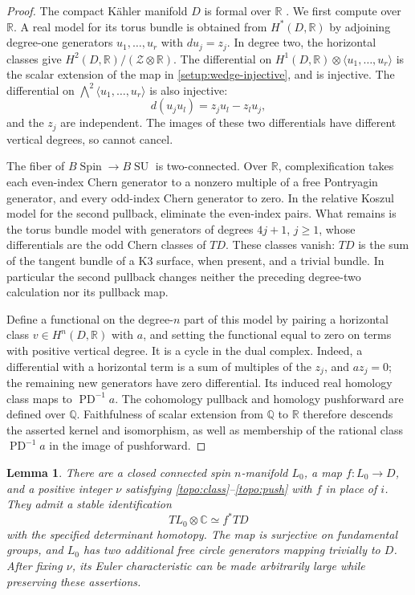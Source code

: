 \documentclass[11pt]{article}
\numberwithin{equation}{section}
\newtheorem{lemma}[theorem]{Lemma}
\theoremstyle{definition}
\theoremstyle{remark}
\newcommand{\Q}{\mathbb Q}
\newcommand{\R}{\mathbb R}
\newcommand{\C}{\mathbb C}
\DeclareMathOperator{\PD}{PD}
\DeclareMathOperator{\Spin}{Spin}
\DeclareMathOperator{\SU}{SU}
\begin{document}
\begin{proof}
The compact K\"ahler manifold $D$ is formal over $\R$
\cite{DeligneGriffithsMorganSullivan}.  We first compute over $\R$.
A real model for its torus bundle is obtained from $H^*(D,\R)$
by adjoining degree-one
generators $u_1,\ldots,u_r$ with $du_j=z_j$.  In degree two, the
horizontal classes give $H^2(D,\R)/(\mathcal Z\otimes\R)$.
The differential on
$H^1(D,\R)\otimes\langle u_1,\ldots,u_r\rangle$ is the scalar
extension of the map in \eqref{setup:wedge-injective}, and is
injective.  The differential
on $\bigwedge^2\langle u_1,\ldots,u_r\rangle$ is also injective:
\[
 d(u_j u_l)=z_j u_l-z_l u_j,
\]
and the $z_j$ are independent.  The images of these two differentials
have different vertical degrees, so cannot cancel.

The fiber of $B\Spin\to B\SU$ is two-connected.  Over $\R$,
complexification takes each even-index Chern generator to a nonzero
multiple of a free Pontryagin generator, and every odd-index Chern
generator to zero.  In the relative Koszul model for the second
pullback, eliminate the even-index pairs.  What remains is the torus
bundle model with generators of degrees $4j+1$, $j\geq1$, whose
differentials are the odd Chern classes of $TD$.  These classes vanish:
$TD$ is the sum of the tangent bundle of a K3 surface, when present,
and a trivial bundle.  In particular the second pullback changes
neither the preceding degree-two calculation nor its pullback map.

Define a functional on the degree-$n$ part of this model by pairing
a horizontal class $v\in H^n(D,\R)$ with $a$, and setting the
functional equal to zero on terms with positive vertical degree.
It is a cycle in the dual complex.  Indeed, a differential with a
horizontal term is a sum of multiples of the $z_j$, and
$a z_j=0$; the remaining new generators have zero differential.
Its induced real homology class maps to $\PD^{-1}a$.
The cohomology pullback and homology pushforward are defined over
$\Q$.  Faithfulness of scalar extension from $\Q$ to $\R$ therefore
descends the asserted kernel and isomorphism, as well as membership
of the rational class $\PD^{-1}a$ in the image of pushforward.
\end{proof}

\begin{lemma}\label{topo:source}
There are a closed connected spin $n$-manifold $L_0$, a map
$f:L_0\to D$, and a positive integer $\nu$ satisfying
\eqref{topo:class}--\eqref{topo:push} with $f$ in place of $i$.
They admit a stable identification
\begin{equation}\label{topo:stable}
 TL_0\otimes\C\simeq f^*TD
\end{equation}
with the specified determinant homotopy.  The map is surjective on
fundamental groups, and $L_0$ has two additional free circle generators
mapping trivially to $D$.  After fixing $\nu$, its Euler characteristic
can be made arbitrarily large while preserving these assertions.
\end{lemma}
\end{document}
